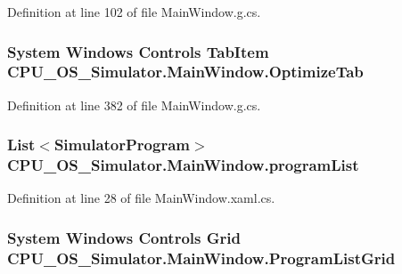 Definition at line 102 of file Main\+Window.\+g.\+cs.

\hypertarget{class_c_p_u___o_s___simulator_1_1_main_window_a47b1359d9e96abf2b0935eb3392405d4}{}
\subsubsection[{Optimize\+Tab}]{\setlength{\rightskip}{0pt plus 5cm}System Windows Controls Tab\+Item C\+P\+U\+\_\+\+O\+S\+\_\+\+Simulator.\+Main\+Window.\+Optimize\+Tab\hspace{0.3cm}{\ttfamily [package]}}\label{class_c_p_u___o_s___simulator_1_1_main_window_a47b1359d9e96abf2b0935eb3392405d4}


Definition at line 382 of file Main\+Window.\+g.\+cs.

\hypertarget{class_c_p_u___o_s___simulator_1_1_main_window_a48fa4dc074c098338a652dbd6a3434c7}{}
\subsubsection[{program\+List}]{\setlength{\rightskip}{0pt plus 5cm}List$<${\bf Simulator\+Program}$>$ C\+P\+U\+\_\+\+O\+S\+\_\+\+Simulator.\+Main\+Window.\+program\+List\hspace{0.3cm}{\ttfamily [private]}}\label{class_c_p_u___o_s___simulator_1_1_main_window_a48fa4dc074c098338a652dbd6a3434c7}


Definition at line 28 of file Main\+Window.\+xaml.\+cs.

\hypertarget{class_c_p_u___o_s___simulator_1_1_main_window_adb8397cdbc794d18b0379ba7251d2278}{}
\subsubsection[{Program\+List\+Grid}]{\setlength{\rightskip}{0pt plus 5cm}System Windows Controls Grid C\+P\+U\+\_\+\+O\+S\+\_\+\+Simulator.\+Main\+Window.\+Program\+List\+Grid\hspace{0.3cm}{\ttfamily [package]}}\label{class_c_p_u___o_s___simulator_1_1_main_window_adb8397cdbc794d18b0379ba7251d2278}


